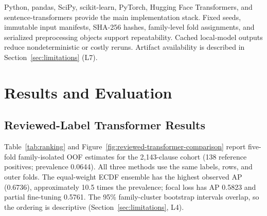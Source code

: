\documentclass[12pt,a4paper,oneside]{report}
\begin{document}
Python, pandas, SciPy, scikit-learn, PyTorch, Hugging Face Transformers, and sentence-transformers provide the main implementation stack. Fixed seeds, immutable input manifests, SHA-256 hashes, family-level fold assignments, and serialized preprocessing objects support repeatability. Cached local-model outputs reduce nondeterministic or costly reruns. Artifact availability is described in Section~\ref{sec:limitations} (L7).

\chapter{Results and Evaluation}

\section{Reviewed-Label Transformer Results}

Table~\ref{tab:ranking} and Figure~\ref{fig:reviewed-transformer-comparison} report five-fold family-isolated OOF estimates for the 2,143-clause cohort (138 reference positives; prevalence 0.0644). All three methods use the same labels, rows, and outer folds. The equal-weight ECDF ensemble has the highest observed AP (0.6736), approximately 10.5 times the prevalence; focal loss has AP 0.5823 and partial fine-tuning 0.5761. The 95\% family-cluster bootstrap intervals overlap, so the ordering is descriptive (Section~\ref{sec:limitations}, L4).

\begin{table}[!tbp]
\caption{Five-fold family-isolated OOF ranking and operating-point results on the 2,143-clause development cohort (138 reference positives). The 95\% AP intervals resample nine families. Confusion counts are TP/FP/TN/FN at the nested operating point selected for a minimum fitting-side precision target of 0.50.}
\label{tab:ranking}
\centering
{}
\end{table}
\end{document}
